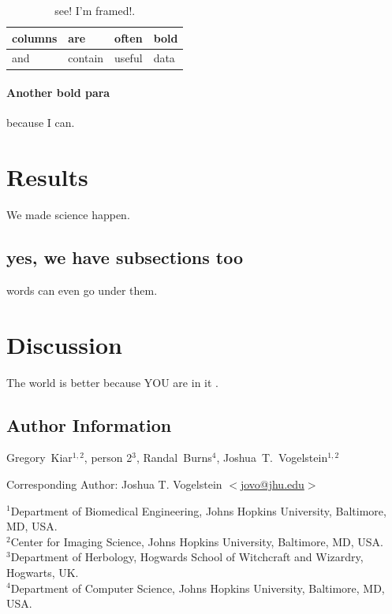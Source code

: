 \documentclass[12pt]{article}
\begin{document}
\begin{table}[h!]
\begin{cframed}[lgray]
\centering
\caption{see! I'm framed!.}
\begin{tabular}{ l  Q  Q  L }
\hline
\textbf{columns}	& \textbf{are} & \textbf{often} & \textbf{bold} \\ \hline \hline
and  & contain & useful & data \\ \hline
\end{tabular}
\makeatletter
\let\@currsize\normalsize
\label{tab:hurdles}
\end{cframed}
\end{table}

\paragraph{Another bold para}
because I can. \cite{ndmg}

\section{Results}

We made science happen.
 
\subsection{yes, we have subsections too}
words can even go under them.


\section{Discussion}

The world is better because YOU are in it \cite{openconnectome}.


\subsection*{Author Information}
{\normalsize Gregory~Kiar$^{1,2}$, person 2$^{3}$, Randal~Burns$^{4}$, Joshua~T.~Vogelstein$^{1,2}$ }

{\small \noindent Corresponding Author: Joshua T. Vogelstein $<$\url{jovo@jhu.edu}$>$}

\begin{spacing}{0.3}
{\normalsize \noindent${^1}$Department of Biomedical Engineering, Johns Hopkins University, Baltimore, MD, USA.\\
${^2}$Center for Imaging Science, Johns Hopkins University, Baltimore, MD, USA.\\
${^3}$Department of Herbology, Hogwards School of Witchcraft and Wizardry, Hogwarts, UK.\\
${^4}$Department of Computer Science, Johns Hopkins University, Baltimore, MD, USA.}
\end{spacing}
\end{document}
